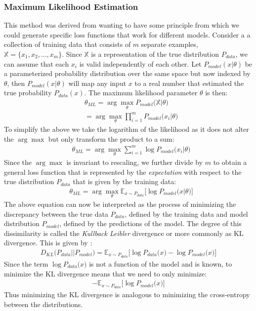 \documentclass[12pt]{extarticle}
\numberwithin{equation}{section}
\begin{document}
	\subsubsection{Maximum Likelihood Estimation}
	This method was derived from wanting to have some principle from which we could generate specific loss functions that work for different models. Consider a a collection of training data that consists of $m$ separate examples, $\mathbb{X} = \{x_1, x_2, ..., x_m\}$. Since $\mathbb{X}$ is a representation of the true distribution $P_{data}$, we can assume that each $x_i$ is valid independently of each other. Let $P_{model}(x|\theta)$ be a parameterized probability distribution over the same space but now indexed by $\theta$, then $P_{model}(x|\theta)$ will map any input $x$ to a real number that estimated the true probability $P_{data}(x)$. The maximum likelihood parameter $\theta$ is then:
	\begin{align}
	&\theta_{ML} = \arg\max_{\theta}P_{model}\big(\mathbb{X}|\theta\big)\nonumber\\
	& = \arg\max_{\theta}\prod_{i=1}^{m}P_{model}\big(x_i|\theta\big)
	\end{align}		
	To simplify the above we take the logarithm of the likelihood as it does not alter the $\arg\max$ but only transform the product to a sum:
	\begin{align}
	& \theta_{ML}=\arg\max_{\theta}\sum_{i=1}^{m}\log P_{model}\big(x_i|\theta\big)
	\end{align}
	Since the $\arg\max$ is invariant to rescaling, we further divide by $m$ to obtain a general loss function that is represented by the \textit{expectation} with respect to the true distribution $P_{data}$ that is given by the training data:
	\begin{align}
	& \theta_{ML} = \arg\max_{\theta}\mathbb{E}_{x\sim P_{data}}\big[\log P_{model}\big(x|\theta\big)\big]
	\end{align}
	The above equation can now be interpreted as the process of minimizing the discrepancy between the true data $P_{data}$, defined by the training data and model distribution $P_{model}$, defined by the predictions of the model. The degree of this dissimilarity is called the \textit{Kullback Leibler} divergence or more commonly as KL divergence. This is given by :
	\begin{align}
	D_{KL}\big(P_{data}||P_{model} \big) = \mathbb{E}_{x\sim P_{data}}\big[\log P_{data}\big(x\big) - \log P_{model}\big(x\big)\big]
	\end{align}
	Since the term $\log P_{data}\big(x\big)$ is not a function of the model and is known, to minimize the KL divergence means that we need to only minimize:
	\begin{align}
	- \mathbb{E}_{x \sim P_{data}}\big[\log P_{model}\big(x\big)\big]
	\end{align}
	Thus minimizing the KL divergence is analogous to minimizing the cross-entropy between the distributions.
\end{document}
